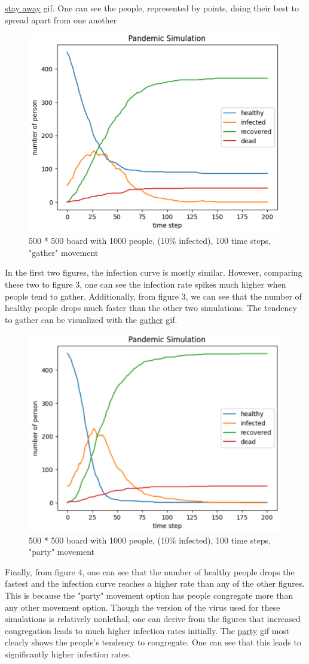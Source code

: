\documentclass{article}
\begin{document}
\href{https://github.com/UChi-ComPy23/group-project-group2/blob/main/doc/final/stayaway.gif}{stay away} gif. One can see the people, represented by points, doing their best to spread apart from one another
\begin{figure}[H]
    \centering
    \includegraphics[width=.6\linewidth]{figure3.png}
    \caption{500 * 500 board with 1000 people, (10\% infected), 100 time steps, "gather" movement}
    \label{fig:enter-label}
\end{figure}
In the first two figures, the infection curve is mostly similar. However, comparing these two to figure 3, one can see the infection rate spikes much higher when people tend to gather. Additionally, from figure 3, we can see that the number of healthy people drops much faster than the other two simulations. The tendency to gather can be visualized with the
\href{https://github.com/UChi-ComPy23/group-project-group2/blob/main/doc/final/gather.gif}{gather} gif.
\begin{figure}[H]
    \centering
    \includegraphics[width=.6\linewidth]{figure4.png}
    \caption{500 * 500 board with 1000 people, (10\% infected), 100 time steps, "party" movement}
    \label{fig:enter-label}
\end{figure}
Finally, from figure 4, one can see that the number of healthy people drops the fastest and the infection curve reaches a higher rate than any of the other figures. This is because the "party" movement option has people congregate more than any other movement option. Though the version of the virus used for these simulations is relatively nonlethal, one can derive from the figures that increased congregation leads to much higher infection rates initially. The \href{https://github.com/UChi-ComPy23/group-project-group2/blob/main/doc/final/party.gif}{party} gif most clearly shows the people's tendency to congregate. One can see that this leads to significantly higher infection rates.\\\\
\end{document}
